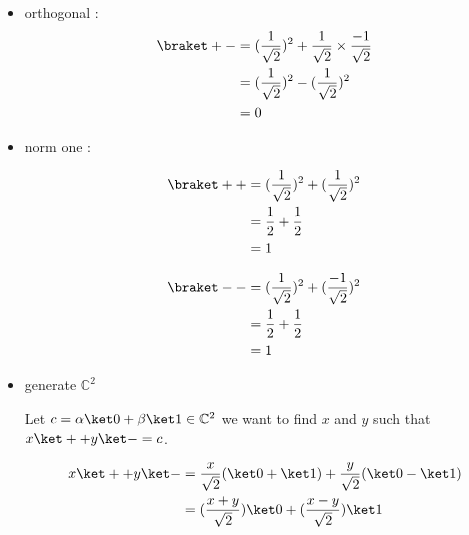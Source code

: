 \begin{itemize}
  \item orthogonal :
    \begin{align*}
      \braket + - &= (\frac 1 {\sqrt 2})^2 + \frac 1 {\sqrt 2} \times
          \frac{-1}{\sqrt 2} \\
            &= (\frac 1 {\sqrt 2})^2 - (\frac 1 {\sqrt 2})^2 \\
            &= 0
    \end{align*}

  \item norm one :
    \begin{multicols}{2}
      \begin{align*}
        \braket + + &= (\frac 1 {\sqrt 2})^2 + (\frac 1 {\sqrt 2})^2 \\
            &= \frac 1 2 + \frac 1 2 \\
            &= 1
      \end{align*}

      \begin{align*}
        \braket - - &= (\frac 1 {\sqrt 2})^2 + (\frac{-1}{\sqrt 2})^2 \\
            &= \frac 1 2 + \frac 1 2 \\
            &= 1
      \end{align*}
    \end{multicols}

  \item generate $\mathbb C^2$ 

    Let $c = \alpha \ket 0 + \beta \ket 1 \in \mathbb C^2$ we want to find $x$
    and $y$ such that $x \ket + + y \ket - = c$.

    \begin{align*}
      x \ket + + y \ket - &= 
      \frac x {\sqrt 2}(\ket 0 + \ket 1) + \frac y {\sqrt 2}(\ket 0 - \ket 1) \\
      &= (\frac {x + y} {\sqrt 2}) \ket 0 + (\frac {x - y}{\sqrt 2}) \ket 1
    \end{align*}


\end{itemize}
